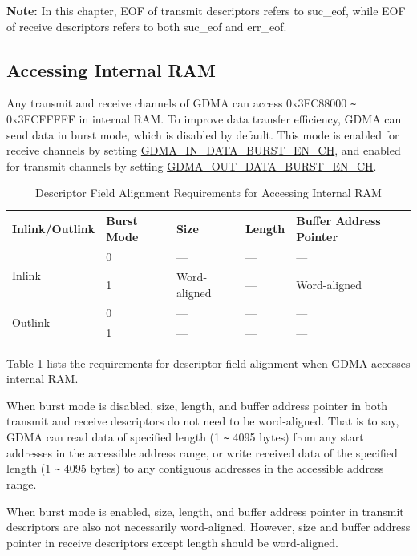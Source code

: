 \documentclass[main\_\_EN.tex]{subfiles}
\begin{document}
{\bfseries Note: }In this chapter, EOF of transmit descriptors refers to suc\_eof, while EOF of receive descriptors refers to both suc\_eof and err\_eof.

\subsection{Accessing Internal RAM}\label{sec:dma-access-inter-ram}

Any transmit and receive channels of GDMA can access 0x{}3FC88000 \verb+~+ 0x{}3FCFFFFF in internal RAM. To improve data transfer efficiency, GDMA can send data in burst mode, which is disabled by default. This mode is enabled for receive channels by setting \hyperref[fielddesc:DMAINDATABURSTENCHN]{GDMA\_IN\_DATA\_BURST\_EN\_CH}, and enabled for transmit channels by setting \hyperref[fielddesc:DMAOUTDATABURSTENCHN]{GDMA\_OUT\_DATA\_BURST\_EN\_CH}.

\begin{longtable}[c]{ | l | l | l | l | l | }
    \caption{Descriptor Field Alignment Requirements for Accessing Internal RAM}
    \label{tab:gdma-inter-desc-param-align}
    \\\hline
    \rowcolor{lightgray}
    Inlink/Outlink & Burst Mode & Size & Length & Buffer Address Pointer \\\hline

    \multirow{2}{*}{Inlink}  & 0  & --- & ---  & --- \\\cline{2-5}
     & 1 & Word-aligned   & ---  & Word-aligned \\\hline
    \multirow{2}{*}{Outlink} & 0  & --- & ---  & --- \\\cline{2-5}
     & 1 & --- & ---  & --- \\\hline
\end{longtable}

Table \ref{tab:gdma-inter-desc-param-align} lists the requirements for descriptor field alignment when GDMA accesses internal RAM.

When burst mode is disabled, size, length, and buffer address pointer in both transmit and receive descriptors do not need to be word-aligned. That is to say, GDMA can read data of specified length (1 \verb+~+ 4095 bytes) from any start addresses in the accessible address range, or write received data of the specified length (1 \verb+~+ 4095 bytes) to any contiguous addresses in the accessible address range.

When burst mode is enabled, size, length, and buffer address pointer in transmit descriptors are also not necessarily word-aligned. However, size and buffer address pointer in receive descriptors except length should be word-aligned.
\end{document}
